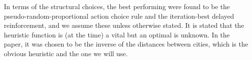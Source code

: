 In terms of the structural choices, the best performing were found to be the pseudo-random-proportional action choice rule and the iteration-best delayed reinforcement, and we assume these unless otherwise stated. It is stated that the heuristic function is (at the time) a vital but an optimal is unknown. In the paper, it was chosen to be the inverse of the distances between cities, which is the obvious heuristic and the one we will use.  